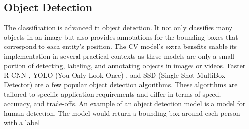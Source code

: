 \subsection*{Object Detection}
The classification is advanced in object detection. It not only classifies many objects in an image but also provides annotations for the bounding boxes that correspond to each entity's position. The CV model's extra benefits enable its implementation in several practical contexts as these models are only a small portion of detecting, labeling, and annotating objects in images or videos. Faster R-CNN \cite{girshick2014rich}, YOLO (You Only Look Once) \cite{redmon2016you}, and SSD (Single Shot MultiBox Detector)\cite{liu2016ssd} are a few popular object detection algorithms. These algorithms are tailored to specific application requirements and differ in terms of speed, accuracy, and trade-offs.  An example of an object detection model is a model for human detection. The model would return a bounding box around each person with a label

